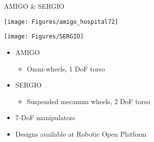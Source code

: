 \documentclass[12pt,a4paper]{article}
\newcommand{\emptylogo}{\texttt{[image: Figures/Empty]}}
\begin{document}
\begin{slidetop}


\begin{multicols}{2}

\begin{bclogo}[couleur = white, arrondi = 0.25, couleurBord = tuedarkblue , barre = none, logo=\emptylogo]{\textcolor{tuedarkblue}{AMIGO \& SERGIO}}
\medskip %
\begin{minipage}[T]{0.48\linewidth}
	\begin{center}
		\texttt{[image: Figures/amigo\_hospital72]}
	\end{center}
\end{minipage}
\hfill
\begin{minipage}[T]{0.48\linewidth}
    \begin{center}
    	\texttt{[image: Figures/SERGIO]}
    \end{center}
\end{minipage}
    \begin{itemize}[itemsep = 0pt, parsep = 0pt, leftmargin=15pt]
    	\item AMIGO
    	\begin{itemize}[itemsep = 0pt, parsep = 0pt, leftmargin=15pt]
    		\item Omni-wheels, 1 DoF torso
    	\end{itemize}
    	\item SERGIO
    	\begin{itemize}[itemsep = 0pt, parsep = 0pt, leftmargin=15pt]
    		\item Suspended mecanum wheels, 2 DoF torso
    	\end{itemize}
        \item 7-DoF manipulators
        \item Designs available at Robotic Open Platform
    \end{itemize}
\end{bclogo}

\vspace{-0.8cm} %


\end{multicols}
\end{slidetop}
\end{document}
